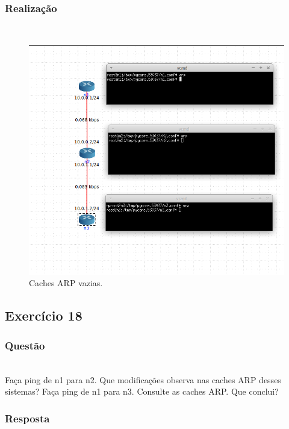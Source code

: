 \documentclass{llncs}
\begin{document}
\subsubsection{Realização}\rule[-10pt]{0pt}{10pt}\\

\begin{figure}
  \begin{center}
    \includegraphics[scale=0.6]{./imagens/5_17.png} 
  \end{center}
  \caption{Caches ARP vazias.}
  \label{fig:5_17}
\end{figure} 

\clearpage
\subsection{Exercício 18}
\subsubsection{Questão}\rule[-10pt]{0pt}{10pt}\\

Faça ping de n1 para n2. Que modificações observa nas caches ARP desses sistemas? Faça ping de n1 para n3. Consulte as caches ARP. Que conclui?

\subsubsection{Resposta}\rule[-10pt]{0pt}{10pt}\\
\end{document}
